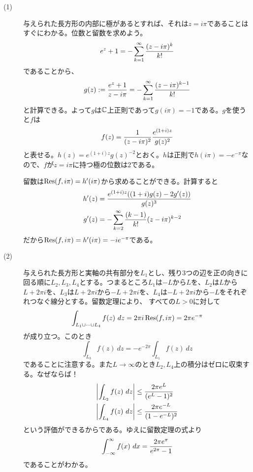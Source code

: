\subsubsection{}%
\begin{sol} ${}$
\begin{description}
  \item[(1)] 与えられた長方形の内部に極があるとすれば、それは$z = i \pi$であることはすぐにわかる。位数と留数を求めよう。
  \[
  e^z + 1 = - \sum_{k=1}^{\infty} \frac{ (z-i \pi)^k }{ k! }
  \]
  であることから、
  \[
  g(z) := \frac{ e^z + 1 }{ z - i \pi } = - \sum_{k=1}^{\infty} \frac{ (z-i \pi)^{k-1} }{ k! }
  \]
  と計算できる。よって$g$は${\mathbb C}$上正則であって$g(i \pi) = -1$である。$g$を使うと$f$は
  \[
  f(z) = \frac{1}{(z- i \pi)^2 } \frac{ e^{ (1+i)z } }{g(z)^2}
  \]
  と表せる。$h(z) = e^{(1+i)z}g(z)^{-2}$とおく。$h$は正則で$h(i \pi)=- e^{- \pi}$なので、$f$が$z = i \pi$に持つ極の位数は$2$である。

  留数は$\operatorname{Res}(f, i \pi) = h'(i \pi)$から求めることができる。計算すると
  \begin{align*}
    h'(z) &= \frac{ e^{(1+i)z} (   (1+i)g(z)- 2 g'(z) ) }{ g(z)^3  } \\
    g'(z) &= - \sum_{k=2}^{\infty} \frac{ (k-1)  }{ k! } (z-i \pi)^{k-2}
  \end{align*}
  だから$\operatorname{Res}(f, i \pi) = h'(i \pi) = - ie^{- \pi}$である。
  \item[(2)] 与えられた長方形と実軸の共有部分を$L_1$とし、残り$3$つの辺を正の向きに回る順に$L_2, L_3, L_4$とする。つまるところ$L_1$は$-L$から$L$を、$L_2$は$L$から$L + 2 \pi i$を、$L_3$は$L + 2 \pi i$から$-L + 2 \pi i$を、$L_4$は$-L + 2 \pi i$から$-L$をそれぞれつなぐ線分とする。留数定理により、
  すべての$L > 0$に対して
  \[
  \int_{L_1 \cup \cdots \cup L_4} f(z) \ dz = 2 \pi i \operatorname{Res}(f, i \pi) = 2 \pi e^{- \pi}
  \]
  が成り立つ。このとき
  \[
  \int_{L_3} f(z) \ dz = - e^{- 2 \pi} \int_{L_1} f(z) \ dz
  \]
であることに注意する。また$L \to \infty$のとき$L_2, L_4$上の積分はゼロに収束する。なぜならば！
\begin{align*}
  \left \lvert  \int_{L_2} f(z) \ dz  \right \rvert &\leq \frac{ 2 \pi e^L}{ (e^L - 1)^2  } \\
  \left \lvert  \int_{L_4} f(z) \ dz  \right \rvert &\leq \frac{ 2 \pi e^{-L}  }{ (1 - e^{-L})^2  }
\end{align*}
という評価ができるからである。ゆえに留数定理の式より
\[
 \int_{- \infty}^{ \infty} f(x) \ dx = \frac{ 2 \pi e^{\pi}  }{ e^{2 \pi} -1 }
\]
であることがわかる。
\end{description}
\end{sol}
